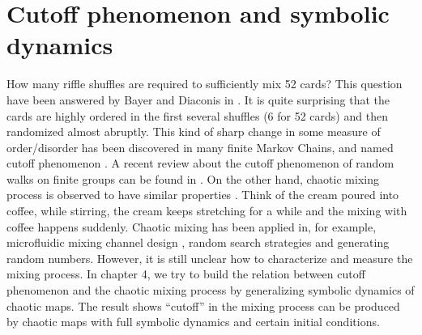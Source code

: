 \section{Cutoff phenomenon and symbolic dynamics}
How many riffle shuffles are required to sufficiently mix 52 cards? This question have been
answered by Bayer and Diaconis in \cite{Diaconis1992}. It is quite surprising that the cards are
highly ordered in the first several shuffles (6 for 52 cards) and then randomized almost abruptly.
This kind of sharp change in some measure of order/disorder has been discovered in many finite
Markov Chains, and named cutoff phenomenon \cite{Diaconis1986}. A recent review about the cutoff
phenomenon of random walks on finite groups can be found in \cite{LSaloff-Costt2004}. On the other
hand, chaotic mixing process is observed to have similar
properties \cite{Thiffeault2003-13, Thiffeault2004, Tsang2005}. Think of the cream poured
into coffee, while stirring, the cream keeps stretching for a while and the mixing with coffee
happens suddenly. Chaotic mixing has been applied in, for example, microfluidic mixing channel
design \cite{Ottino2004Science, Wiggins2004, Ottino2004}, random search strategies and
generating random numbers. However, it is still unclear how to characterize and measure the mixing
process. In chapter 4, we try to build the relation between cutoff phenomenon and the chaotic
mixing process by generalizing symbolic dynamics of chaotic maps. The result shows ``cutoff'' in
the mixing process can be produced by chaotic maps with full symbolic dynamics and certain initial
conditions.
